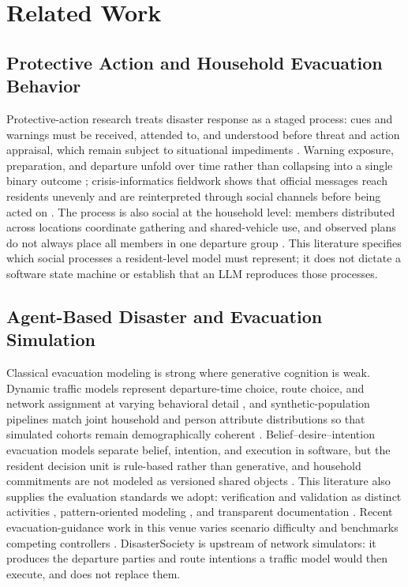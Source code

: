 \documentclass[journal]{IEEEtran}
\begin{document}
\section{Related Work}
\label{sec:related}

\subsection{Protective Action and Household Evacuation Behavior}

Protective-action research treats disaster response as a staged process: cues
and warnings must be received, attended to, and understood before threat and
action appraisal, which remain subject to situational impediments
\cite{lindell2012padm,mileti1992warnings,kuligowski2021wildfire}. Warning
exposure, preparation, and departure unfold over time rather than collapsing
into a single binary outcome \cite{grajdura2021awareness}; crisis-informatics
fieldwork shows that official messages reach residents unevenly and are
reinterpreted through social channels before being acted on
\cite{palen2018crisis}. The process is
also social at the household level: members distributed across locations
coordinate gathering and shared-vehicle use, and observed plans do not always
place all members in one departure group
\cite{huang2012ike,liu2014uniting,maghelal2017split}. This literature specifies
which social processes a resident-level model must represent; it does not
dictate a software state machine or establish that an LLM reproduces those
processes.

\subsection{Agent-Based Disaster and Evacuation Simulation}

Classical evacuation modeling is strong where generative cognition is weak.
Dynamic traffic models represent departure-time choice, route choice, and
network assignment at varying behavioral detail
\cite{murraytuite2013overview}, and synthetic-population
pipelines match joint household and person attribute distributions so that
simulated cohorts remain demographically coherent
\cite{beckman1996synthetic,ye2009ipu}.
Belief--desire--intention evacuation models separate belief, intention, and
execution in software, but the resident decision unit is rule-based rather than
generative, and household commitments are not modeled as versioned shared
objects \cite{dawson2012warning}. This literature also supplies the evaluation
standards we adopt: verification and validation as distinct activities
\cite{sargent2013verification,klugl2008validation}, pattern-oriented modeling
\cite{grimm2005pattern}, and transparent documentation
\cite{grimm2020odd}. Recent evacuation-guidance work in this venue varies
scenario difficulty and benchmarks competing controllers
\cite{zhao2025evacrobot}. DisasterSociety is upstream of
network simulators: it produces the departure parties and route intentions a
traffic model would then execute, and does not replace them.
\end{document}
